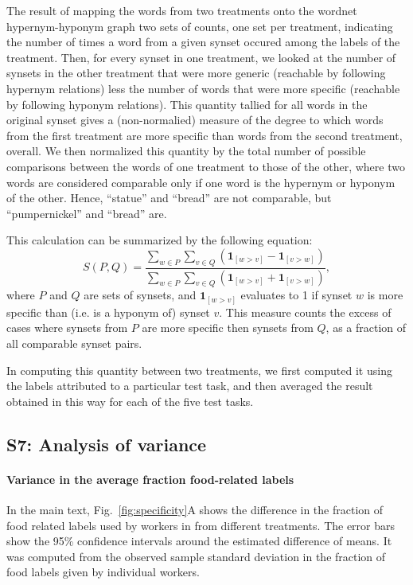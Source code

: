 \documentclass[12pt]{article}
\begin{document}
The result of mapping the words from two treatments onto the wordnet 
hypernym-hyponym graph two sets of counts, one set per treatment, 
indicating the number of times a word from a given synset occured among the
labels of the treatment.  Then, for every synset in one treatment, we looked
at the number of synsets in the other treatment that were more generic
(reachable by following hypernym relations) less the number of words that
were more specific (reachable by following hyponym relations).  This quantity
tallied for all words in the original synset gives a (non-normalied) measure
of the degree to which words from the first treatment are more specific
than words from the second treatment, overall.  We then normalized this 
quantity by the total number of possible comparisons between the words of
one treatment to those of the other, where two words are considered comparable
only if one word is the hypernym or hyponym of the other.  Hence, ``statue'' 
and ``bread'' are not comparable, but ``pumpernickel'' and ``bread'' are.

This calculation can be summarized by the following equation:
\begin{equation}
	S(P,Q) = \frac{
		\sum_{w\in P}\sum_{v\in Q} \left(
			\mathbf{1}_{[w>v]} - \mathbf{1}_{[v>w]} \right)
	}{
		\sum_{w\in P}\sum_{v\in Q} \left(
			\mathbf{1}_{[w>v]} + \mathbf{1}_{[v>w]} \right)
	},
\end{equation}
where $P$ and $Q$ are sets of synsets, and $\mathbf{1}_{[w>v]}$ evaluates
to 1 if synset $w$ is more specific than (i.e. is a hyponym of) synset $v$.
This measure counts the excess of cases where synsets from $P$ are more
specific then synsets from $Q$, as a fraction of all comparable synset pairs. 

In computing this quantity between two treatments, we first computed it 
using the labels attributed to a particular test task, and then
averaged the result obtained in this way for each of the five test tasks.

\subsection*{S7: Analysis of variance}
	\paragraph{Variance in the average fraction food-related labels}
	In the main text, Fig.~\ref{fig:specificity}A shows the difference in 
	the fraction of food related labels used by workers in from different 
	treatments.  The error bars show the 95\% confidence intervals around 
	the estimated difference of means.  It was computed from the
	observed sample standard deviation in the fraction of food labels given
	by individual workers.
\end{document}
